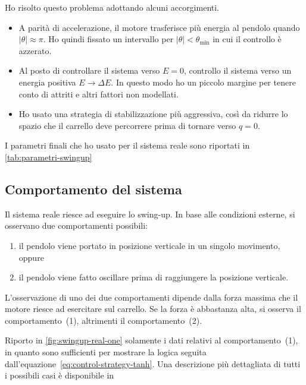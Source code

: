 Ho risolto questo problema adottando alcuni accorgimenti.
\begin{itemize}
    \item A parità di accelerazione, il motore trasferisce più
    energia al pendolo quando $|\theta| \approx \pi$\footnotemark.
    Ho quindi fissato un intervallo per $|\theta| < \theta_{\min} $ in cui il
    controllo è azzerato.

    \item Al posto di controllare il sistema verso $E = 0$,
    controllo il sistema verso un energia positiva $E \to \Delta E$.
    In questo modo ho un piccolo margine per tenere conto di attriti
    e altri fattori non modellati.

    \item Ho usato una strategia di stabilizzazione più aggressiva,
    così da ridurre lo spazio che il carrello deve percorrere prima
    di tornare verso $q = 0$.
\end{itemize}

I parametri finali che ho usato per il sistema reale sono riportati
in \autoref{tab:parametri-swingup}



\subsection{Comportamento del sistema}
Il sistema reale riesce ad eseguire lo swing-up.
In base alle condizioni esterne\footnotemark, si osservano due
comportamenti possibili:
\begin{enumerate}
    \item il pendolo viene portato in posizione verticale in un
    singolo movimento, oppure
    \item il pendolo viene fatto oscillare prima di raggiungere la
    posizione verticale.
\end{enumerate}
L'osservazione di uno dei due comportamenti dipende
dalla forza massima che il motore riesce ad esercitare sul carrello.
Se la forza è abbastanza alta, si osserva il comportamento~(1),
altrimenti il comportamento~(2).

Riporto in \autoref{fig:swingup-real-one} solamente i dati relativi al comportamento~(1), in quanto sono
sufficienti per mostrare la logica seguita dall'equazione~\eqref{eq:control-strategy-tanh}.
Una descrizione più dettagliata di tutti i possibili casi è disponibile in

